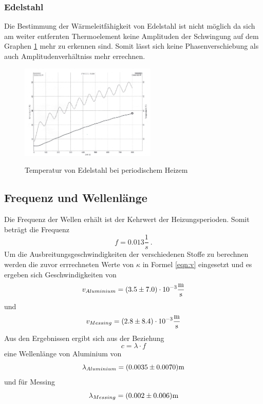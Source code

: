 \subsubsection{Edelstahl}
Die Bestimmung der Wärmeleitfähigkeit von Edelstahl ist nicht möglich da sich am weiter entfernten Thermoelement keine Amplituden der Schwingung auf dem Graphen \ref{fig:Graph3} mehr zu erkennen sind. Somit lässt sich keine Phasenverschiebung als auch Amplitudenverhältniss mehr errechnen. 
\begin{figure}
        \centering
        \caption{Temperatur von Edelstahl bei periodischem Heizem}
        \includegraphics[height=4.5cm]{./Graph_3.png}
        \label{fig:Graph3}
\end{figure}

\subsection{Frequenz und Wellenlänge}
Die Frequenz der Wellen erhält ist der Kehrwert der Heizungsperioden. Somit beträgt die Frequenz 
\begin{equation}
	f = 0.013 \frac{1}{s} \ .  
\end{equation}
Um die Ausbreitungsgeschwindigkeiten der verschiedenen Stoffe zu berechnen werden die zuvor errrechneten Werte von $\kappa$ in Formel \ref{eqn:v} eingesetzt und es ergeben sich Geschwindigkeiten von 
\begin{equation}
	v_{Aluminium} =(\num{3.5 +- 7.0}) \cdot 10^{-3} \frac{\text{m}}{\text{s}}
\end{equation} 
und 
\begin{equation}
	v_{Messing} = (\num{2.8 +- 8.4}) \cdot 10^{-3} \frac{\text{m}}{\text{s}} 
\end{equation}
Aus den Ergebnissen ergibt sich aus der Beziehung 
\begin{equation}
	c = \lambda \cdot f
\end{equation} 
eine Wellenlänge von Aluminium von
\begin{equation}
        \lambda_{Aluminium} = (\num{0.0035 +- 0.007}) \text{m}
\end{equation}
und für Messing 
\begin{equation}
	\lambda_{Messing} = (\num{0.002 +- 0.006}) \text{m}
\end{equation}

